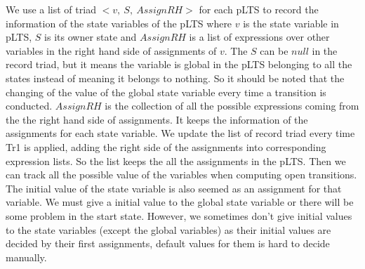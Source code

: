 \documentclass{lncs/llncs}
\newcommand{\QIN}[1]{\textcolor{airforceblue}{#1}}
\begin{document}
\QIN{
We use a list of triad $<v,\ S, \ AssignRH>$ for each pLTS to record the information of the state variables of the pLTS where $v$ is the state variable in pLTS, $S$ is its owner state and $AssignRH$ is a list of expressions over other variables in the right hand side of assignments of $v$. The $S$ can be $null$ in the record triad, but it means the variable is global in the pLTS belonging to all the states instead of meaning it belongs to nothing. So it should be noted that the changing of the value of the global state variable every time a transition is conducted. $AssignRH$ is the collection of all the possible expressions coming from the the right hand side of assignments. It keeps the information of the assignments for each state variable. We update the list of record triad every time Tr1 is applied, adding the right side of the assignments into corresponding expression lists. So the list keeps the all the assignments in the pLTS. Then we can track all the possible value of the variables when computing open transitions. 
The initial value of the state variable is also seemed as an assignment for that variable. We must give a initial value to the global state variable or there will be some problem in the start state. However, we sometimes don't give initial values to the state variables (except the global variables) as their initial values are decided by their first assignments, default values for them is hard to decide manually.
}
\end{document}
